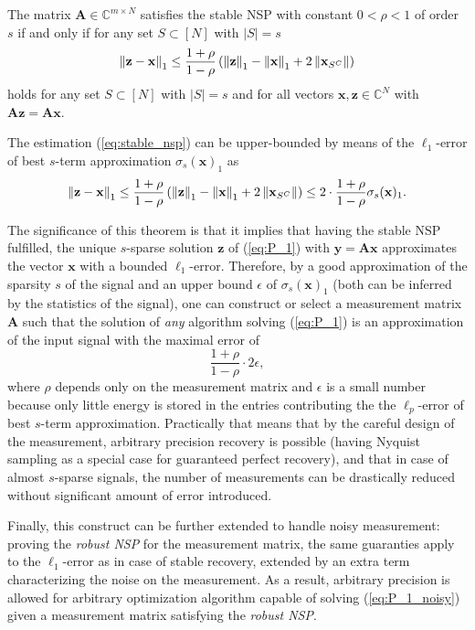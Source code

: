 \begin{theorem}
The matrix $\mathbf{A} \in \mathbb{C}^{m \times N}$ satisfies the stable NSP with constant $0 < \rho < 1$ of order $s$ if and only if for any set $S \subset [N]$ with $|S| = s$
\begin{equation}\label{eq:stable_nsp}
    \left\lVert\mathbf{z} - \mathbf{x}\right\rVert_1 \le \frac{1 + \rho}{1 - \rho} \left(\left\lVert\mathbf{z}\right\rVert_1 - \left\lVert\mathbf{x}\right\rVert_1 + 2\left\lVert\mathbf{x}_{S^C}\right\rVert\right)
\end{equation}
holds for any set $S \subset [N]$ with $|S| = s$ and for all vectors $\mathbf{x,z} \in \mathbb{C}^N$ with $\mathbf{Az} = \mathbf{Ax}$.
\end{theorem}

\begin{remark}
The estimation (\ref{eq:stable_nsp}) can be upper-bounded by means of the $\ell_1$-error of best $s$-term approximation $\sigma_s(\mathbf{x})_1$ as
\[\left\lVert\mathbf{z} - \mathbf{x}\right\rVert_1 \le \frac{1 + \rho}{1 - \rho} \left(\left\lVert\mathbf{z}\right\rVert_1 - \left\lVert\mathbf{x}\right\rVert_1 + 2\left\lVert\mathbf{x}_{S^C}\right\rVert\right) \le 2 \cdot \frac{1 + \rho}{1 - \rho}\sigma_s(\mathbf{x})_1.\]
\end{remark}

The significance of this theorem is that it implies that having the stable NSP fulfilled, the unique $s$-sparse solution $\mathbf{z}$ of (\ref{eq:P_1}) with $\mathbf{y} = \mathbf{Ax}$ approximates the vector $\mathbf{x}$ with a bounded $\ell_1$-error. Therefore, by a good approximation of the sparsity $s$ of the signal and an upper bound $\epsilon$ of $\sigma_s(\mathbf{x})_1$ (both can be inferred by the statistics of the signal), one can construct or select a measurement matrix $\mathbf{A}$ such that the solution of \textit{any} algorithm solving (\ref{eq:P_1}) is an approximation of the input signal with the maximal error of
\[\frac{1 + \rho}{1 - \rho} \cdot 2\epsilon,\]
where $\rho$ depends only on the measurement matrix and $\epsilon$ is a small number because only little energy is stored in the entries contributing the the $\ell_p$-error of best $s$-term approximation.
Practically that means that by the careful design of the measurement, arbitrary precision recovery is possible (having Nyquist sampling as a special case for guaranteed perfect recovery), and that in case of almost $s$-sparse signals, the number of measurements can be drastically reduced without significant amount of error introduced.

Finally, this construct can be further extended  to handle noisy measurement: proving the \textit{robust NSP} for the measurement matrix, the same guaranties apply to the $\ell_1$-error as in case of stable recovery, extended by an extra term characterizing the noise on the measurement. As a result, arbitrary precision is allowed for arbitrary optimization algorithm capable of solving (\ref{eq:P_1_noisy}) given a measurement matrix satisfying the \textit{robust NSP}.

